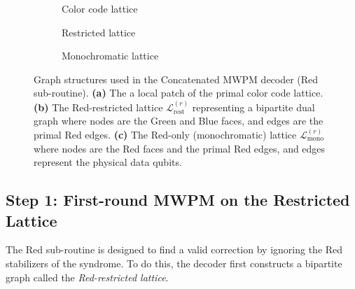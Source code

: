 \begin{figure}[hbt!]
    \centering
    \begin{subfigure}[b]{0.32\textwidth}
        \centering
        \resizebox{\linewidth}{!}{
            
        }
        \caption{Color code lattice}
        \label{fig:concat_primal}
    \end{subfigure}
    \hfill
    \begin{subfigure}[b]{0.32\textwidth}
        \centering
        \resizebox{\linewidth}{!}{
            
        }
        \caption{Restricted lattice}
        \label{fig:concat_restricted}
    \end{subfigure}
    \hfill
    \begin{subfigure}[b]{0.32\textwidth}
        \centering
        \resizebox{\linewidth}{!}{
            
        }
        \caption{Monochromatic lattice}
        \label{fig:concat_mono}
    \end{subfigure}
    
    \caption[Graph structures used in the Concatenated MWPM decoder.]{Graph structures used in the Concatenated MWPM decoder (Red sub-routine). \textbf{(a)} The a local patch of the primal color code lattice. \textbf{(b)} The Red-restricted lattice $\mathcal{L}_\text{rest}^{(r)}$ representing a bipartite dual graph where nodes are the Green and Blue faces, and edges are the primal Red edges. \textbf{(c)} The Red-only (monochromatic) lattice $\mathcal{L}_\text{mono}^{(r)}$ where nodes are the Red faces and the primal Red edges, and edges represent the physical data qubits.}
    \label{fig:4:concatenated_graphs}
\end{figure}


\subsection{Step 1: First-round MWPM on the Restricted Lattice}
 The Red sub-routine is designed to find a valid correction by ignoring the Red stabilizers of the syndrome. To do this, the decoder first constructs a bipartite graph called the \textit{Red-restricted lattice}.

